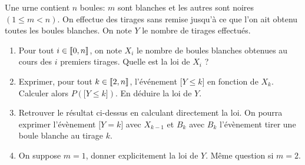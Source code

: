 \documentclass[a4paper, 11pt,reqno]{article}
\begin{document}
\begin{exercice}  \;
	Une urne contient $n$ boules: $m$ sont blanches et les autres sont noires $(1\leq m<n)$. On effectue des tirages sans remise jusqu'\`a ce que l'on ait obtenu toutes les boules blanches. On note $Y$ le nombre de tirages effectu\'es.
	\begin{enumerate}
		\item Pour tout $i\in\llbracket  0,n\rrbracket$, on note $X_i$ le nombre de boules blanches obtenues au cours des $i$ premiers tirages. Quelle est la loi de $X_i$ ?
		\item Exprimer, pour tout $k\in\llbracket  2,n\rrbracket$, l'\'ev\'enement $\lbrack Y\leq k\rbrack$ en fonction de $X_k$. Calculer alors $P(\lbrack Y\leq k\rbrack)$. En d\'eduire la loi de $Y$.
		\item Retrouver le r\'esultat ci-dessus en calculant directement la loi. On pourra exprimer l'\'ev\`{e}nement $\lbrack Y=k\rbrack$ avec $X_{k-1}$ et $B_k$ avec $B_k$ l'\'ev\`{e}nement \og tirer une boule blanche au tirage $k$\fg.
		\item On suppose $m=1$, donner explicitement la loi de $Y$. M\^eme question si $m=2$.
	\end{enumerate}
\end{exercice}
\end{document}

